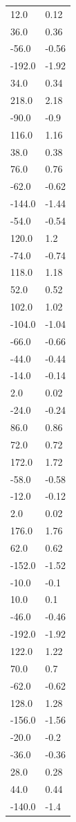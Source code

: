 \begin{longtable}{ll}
12.0 & 0.12 \\
36.0 & 0.36 \\
-56.0 & -0.56 \\
-192.0 & -1.92 \\
34.0 & 0.34 \\
218.0 & 2.18 \\
-90.0 & -0.9 \\
116.0 & 1.16 \\
38.0 & 0.38 \\
76.0 & 0.76 \\
-62.0 & -0.62 \\
-144.0 & -1.44 \\
-54.0 & -0.54 \\
120.0 & 1.2 \\
-74.0 & -0.74 \\
118.0 & 1.18 \\
52.0 & 0.52 \\
102.0 & 1.02 \\
-104.0 & -1.04 \\
-66.0 & -0.66 \\
-44.0 & -0.44 \\
-14.0 & -0.14 \\
2.0 & 0.02 \\
-24.0 & -0.24 \\
86.0 & 0.86 \\
72.0 & 0.72 \\
172.0 & 1.72 \\
-58.0 & -0.58 \\
-12.0 & -0.12 \\
2.0 & 0.02 \\
176.0 & 1.76 \\
62.0 & 0.62 \\
-152.0 & -1.52 \\
-10.0 & -0.1 \\
10.0 & 0.1 \\
-46.0 & -0.46 \\
-192.0 & -1.92 \\
122.0 & 1.22 \\
70.0 & 0.7 \\
-62.0 & -0.62 \\
128.0 & 1.28 \\
-156.0 & -1.56 \\
-20.0 & -0.2 \\
-36.0 & -0.36 \\
28.0 & 0.28 \\
44.0 & 0.44 \\
-140.0 & -1.4 \\

\end{longtable}

